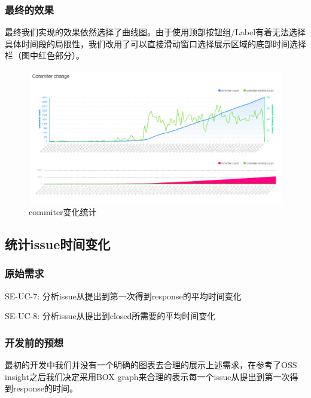 \documentclass[a4paper,20pt]{article}
\begin{document}
\subsubsection{最终的效果}
最终我们实现的效果依然选择了曲线图。由于使用顶部按钮组/Label有着无法选择具体时间段的局限性，我们改用了可以直接滑动窗口选择展示区域的底部时间选择栏（图中红色部分）。
\begin{figure}[h]
\centering
\includegraphics[scale=0.2]{pics/commiterChange.png}
\caption{commiter变化统计}
\label{fig:1}
\end{figure}



\subsection{统计issue时间变化}
\subsubsection{原始需求}
SE-UC-7: 分析issue从提出到第⼀次得到response的平均时间变化\par
SE-UC-8: 分析issue从提出到closed所需要的平均时间变化\par
\subsubsection{开发前的预想}
最初的开发中我们并没有一个明确的图表去合理的展示上述需求，在参考了OSS insight之后我们决定采用BOX graph来合理的表示每一个issue从提出到第⼀次得到response的时间。
\end{document}
